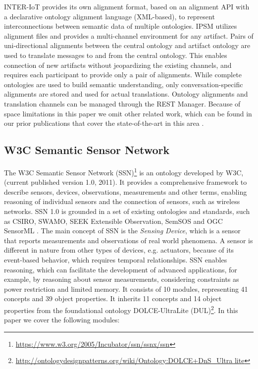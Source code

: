 \documentclass{sig-alternate-05-2015}
\begin{document}
INTER-IoT provides its own alignment format, based on an alignment API with a declarative ontology alignment language (XML-based), to represent interconnections between semantic data of multiple ontologies. IPSM utilizes alignment files and provides a multi-channel environment for any artifact. Pairs of uni-directional alignments between the central ontology and artifact ontology are used to translate messages to and from the central ontology. This enables connection of new artifacts without jeopardizing the existing channels, and requires each participant to provide only a pair of alignments. While complete ontologies are used to build semantic understanding, only conversation-specific alignments are stored and used for actual translations. Ontology alignments and translation channels can be managed through the REST Manager. Because of space limitations in this paper we omit other related work, which can be found in our prior publications that cover the state-of-the-art in this area \cite{Ganzha2017a,Ganzha2016a,Ganzha2015,Ganzha2016}.


\subsection{W3C Semantic Sensor Network}
The W3C Semantic Sensor Network (SSN)\footnote{\url{https://www.w3.org/2005/Incubator/ssn/ssnx/ssn}} \cite{Compton2012} is an ontology developed by W3C, (current published version 1.0, 2011). It provides a comprehensive framework to describe sensors, devices, observations, measurements and other terms, enabling reasoning of individual sensors and the connection of sensors, such as wireless networks. SSN 1.0 is grounded in a set of existing ontologies and standards, such as CSIRO, SWAMO, SEEK Extensible Observation, SemSOS and OGC SensorML \cite{Ganzha2016a}. The main concept of SSN is the \textit{Sensing Device}, which is a sensor that reports measurements and observations of real world phenomena. A sensor is different in nature from other types of devices, e.g. actuators, because of its event-based behavior, which requires temporal relationships. SSN enables reasoning, which can facilitate the development of advanced applications, for example, by reasoning about sensor measurements, considering constraints as power restriction and limited memory. It consists of 10 modules, representing 41 concepts and 39 object properties. It inherits 11 concepts and 14 object properties from the foundational ontology DOLCE-UltraLite (DUL)\footnote{\url{http://ontologydesignpatterns.org/wiki/Ontology:DOLCE+DnS\_Ultra lite}}. In this paper we cover the following modules:
\end{document}
